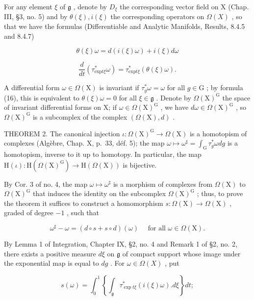 For any element \(\xi\) of \(\mathfrak{g}\) , denote by \(D_{\xi}\) the corresponding vector field on X (Chap. III, §3, no. 5) and by \(\theta(\xi), i(\xi)\) the corresponding operators on \(\Omega(X)\) , so that we have the formulas (Differentiable and Analytic Manifolds, Results, 8.4.5 and 8.4.7)

\[
\theta (\xi) \omega = d (i (\xi) \omega) + i (\xi) d \omega\tag{15}
\]

\[
\frac {d}{d t} (\tau_ {\mathrm{exp} t \xi} ^ {*} \omega) = \tau_ {\mathrm{exp} t \xi} ^ {*} (\theta (\xi) \omega).\tag{16}
\]

A differential form \(\omega \in \Omega(\mathrm{X})\) is invariant if \(\tau_g^*\omega = \omega\) for all \(g \in \mathrm{G}\) ; by formula (16), this is equivalent to \(\theta(\xi)\omega = 0\) for all \(\xi \in \mathfrak{g}\) . Denote by \(\Omega(\mathrm{X})^{\mathrm{G}}\) the space of invariant differential forms on X; if \(\omega \in \Omega(\mathrm{X})^{\mathrm{G}}\) , we have \(d\omega \in \Omega(\mathrm{X})^{\mathrm{G}}\) , so \(\Omega(\mathrm{X})^{\mathrm{G}}\) is a subcomplex of the complex \((\Omega(\mathrm{X}), d)\) .

THEOREM 2. The canonical injection \(\iota : \Omega(\mathrm{X})^{\mathrm{G}} \to \Omega(\mathrm{X})\) is a homotopism of complexes (Algèbre, Chap. X, p.~33, déf. 5); the map \(\omega \mapsto \omega^{\sharp} = \int_{\mathrm{G}} \tau_g^* \omega dg\) is a homotopism, inverse to it up to homotopy. In particular, the map \(\mathrm{H}(\iota) : \mathrm{H}(\Omega(\mathrm{X})^{\mathrm{G}}) \to \mathrm{H}(\Omega(\mathrm{X}))\) is bijective.

By Cor. 3 of no. 4, the map \(\omega \mapsto \omega^{\sharp}\) is a morphism of complexes from \(\Omega(\mathrm{X})\) to \(\Omega(\mathrm{X})^{\mathrm{G}}\) that induces the identity on the subcomplex \(\Omega(\mathrm{X})^{\mathrm{G}}\) ; thus, to prove the theorem it suffices to construct a homomorphism \(s: \Omega(\mathrm{X}) \to \Omega(\mathrm{X})\) , graded of degree \(-1\) , such that

\[
\omega^ {\sharp} - \omega = (d \circ s + s \circ d) (\omega) \quad \text { for   all } \omega \in \Omega (\mathrm{X}).\tag{17}
\]

By Lemma 1 of Integration, Chapter IX, §2, no. 4 and Remark 1 of §2, no. 2, there exists a positive measure \(d\xi\) on \(\mathfrak{g}\) of compact support whose image under the exponential map is equal to \(dg\) . For \(\omega \in \Omega(X)\) , put

\[
s (\omega) = \int_ {0} ^ {1} \left\{\int_ {\mathfrak {g}} \tau_ {\exp t \xi} ^ {*} (i (\xi) \omega). d \xi \right\} d t;
\]

